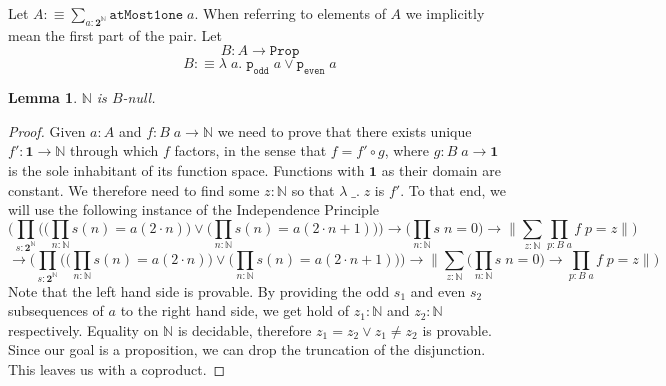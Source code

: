 \documentclass[12pt]{article}
\newtheorem{lem}[thm]{Lemma}
\begin{document}
Let $A :\equiv \sum_{a: \mathbf{2}^\mathbb{N}}\mathtt{atMost1one}\;a$. 
When referring to elements of $A$ we implicitly mean the first part of the pair. 
Let
$$B : A \rightarrow \mathtt{Prop}$$
$$B :\equiv \lambda\; a.\; \mathtt{p_{odd}}\; a \vee \mathtt{p_{even}}\; a$$
\begin{lem}
$\mathbb{N}$ is $B$-null.
\end{lem}
\begin{proof}
Given $a : A$ and $f : B\; a \rightarrow \mathbb{N}$ we need to prove that there exists unique $f' : \mathbf{1} \rightarrow \mathbb{N}$ through which $f$ factors, in the sense that $f = f' \circ g$, where $g : B\; a \rightarrow \mathbf{1}$ is the sole inhabitant of its function space. 
Functions with $\mathbf{1}$ as their domain are constant. 
We therefore need to find some $z : \mathbb{N}$ so that $\lambda\; \_.\; z$ is $f'$. 
To that end, we will use the following instance of the Independence Principle
$$\bigg( \prod_{s : \mathbf{2}^\mathbb{N}} \Big(\big(\prod_{n : \mathbb{N}} s(n) = a(2 \cdot n)\big) \vee \big(\prod_{n : \mathbb{N}} s(n) = a(2\cdot n +1)\big) \Big) \rightarrow \Big(\prod_{n : \mathbb{N}}s\; n = 0 \Big) \rightarrow \Big\lVert \sum_{z : \mathbb{N}}\prod_{p : B\; a} f\; p = z\Big\rVert \bigg)$$
$$\rightarrow \bigg( \prod_{s : \mathbf{2}^\mathbb{N}} \Big(\big(\prod_{n : \mathbb{N}} s(n) = a(2 \cdot n)\big) \vee \big(\prod_{n : \mathbb{N}} s(n) = a(2\cdot n +1)\big) \Big) \rightarrow  \Big\lVert \sum_{z : \mathbb{N}} \Big(\prod_{n : \mathbb{N}}s\; n = 0 \Big) \rightarrow\prod_{p : B\; a} f\; p = z\Big\rVert \bigg)$$
Note that the left hand side is provable. 
By providing the odd $s_1$ and even $s_2$ subsequences of $a$ to the right hand side, we get hold of $z_1 : \mathbb{N}$ and $z_2 : \mathbb{N} $ respectively. 
Equality on $\mathbb{N}$ is decidable, therefore $z_1 = z_2 \vee z_1 \neq z_2$ is provable. 
Since our goal is a proposition, we can drop the truncation of the disjunction. 
This leaves us with a coproduct. 


\end{proof}
\end{document}
